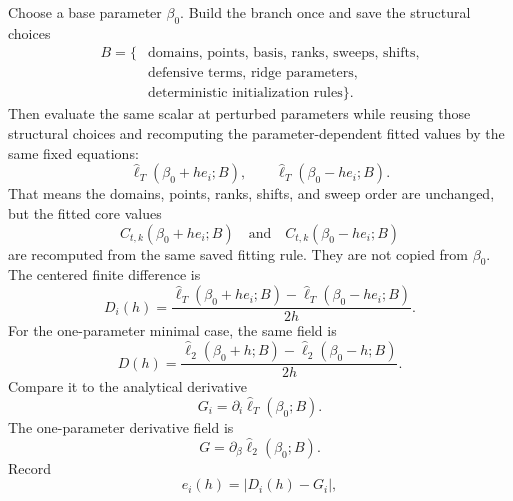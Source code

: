 \documentclass[11pt]{article}
\numberwithin{equation}{section}
\newcommand{\widehatell}{\widehat\ell}
\begin{document}
Choose a base parameter \(\beta_0\).  Build the branch
once and save the structural choices
\begin{equation}
    \begin{aligned}
    B=\{&
    \text{domains, points, basis, ranks, sweeps, shifts,}\\
    &\text{defensive terms, ridge parameters,}\\
    &\text{deterministic initialization rules}\}.
    \end{aligned}
    \label{eq:p24-p19-94}
\end{equation}
Then evaluate the same scalar at perturbed parameters while reusing those
structural choices and recomputing the parameter-dependent fitted values by the
same fixed equations:
\begin{equation}
    \widehatell_T(\beta_0+h e_i;B),
    \qquad
    \widehatell_T(\beta_0-h e_i;B).
    \label{eq:p24-p19-95}
\end{equation}
That means the domains, points, ranks, shifts, and sweep order are unchanged,
but the fitted core values
\begin{equation}
    C_{t,k}(\beta_0+h e_i;B)
    \quad\text{and}\quad
    C_{t,k}(\beta_0-h e_i;B)
    \label{eq:p24-p19-95a}
\end{equation}
are recomputed from the same saved fitting rule.  They are not copied from
\(\beta_0\).
The centered finite difference is
\begin{equation}
    D_i(h)
    =
    \frac{
    \widehatell_T(\beta_0+h e_i;B)
    -
    \widehatell_T(\beta_0-h e_i;B)}
    {2h}.
    \label{eq:p24-p19-96}
\end{equation}
For the one-parameter minimal case, the same field is
\begin{equation}
    D(h)
    =
    \frac{
    \widehatell_2(\beta_0+h;B)
    -
    \widehatell_2(\beta_0-h;B)}
    {2h}.
    \label{eq:p24-p22-fd0a}
\end{equation}
Compare it to the analytical derivative
\begin{equation}
    G_i=\partial_i\widehatell_T(\beta_0;B).
    \label{eq:p24-p19-97}
\end{equation}
The one-parameter derivative field is
\begin{equation}
    G=\partial_\beta\widehatell_2(\beta_0;B).
    \label{eq:p24-p22-fd0b}
\end{equation}
Record
\begin{equation}
    e_i(h)=|D_i(h)-G_i|,
    \label{eq:p24-p19-98}
\end{equation}
\end{document}

